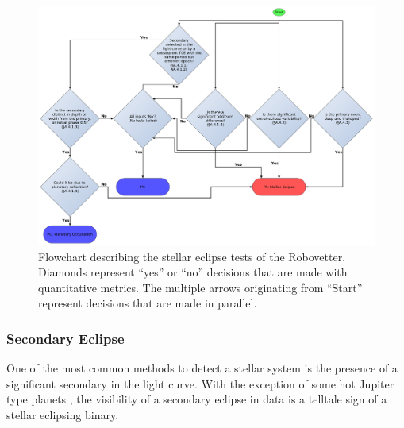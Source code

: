 





\begin{figure}[ht]
\centering
\includegraphics[width=\linewidth]{RoboVetter-Diagram-V4-SigSec.pdf}
\caption{Flowchart describing the stellar eclipse tests of the Robovetter. Diamonds represent ``yes'' or ``no'' decisions that are made with quantitative metrics. The multiple arrows originating from ``Start'' represent decisions that are made in parallel.}
\label{robovetter-sigsec-fig}
\end{figure}


\subsubsection{Secondary Eclipse}

One of the most common methods to detect a stellar system is the presence of a significant secondary in the light curve. With the exception of some hot Jupiter type planets \citep[e.g., HAT-P-7,][]{Borucki2009}, the visibility of a secondary eclipse in \kepler{} data is a telltale sign of a stellar eclipsing binary.


